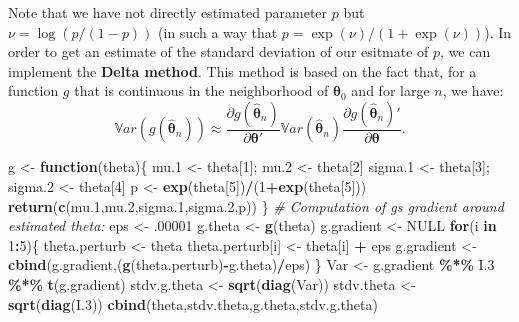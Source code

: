 \documentclass[
  12pt,
]{book}
\newenvironment{Shaded}{\begin{snugshade}}{\end{snugshade}}
\newcommand{\CommentTok}[1]{\textcolor[rgb]{0.56,0.35,0.01}{\textit{#1}}}
\newcommand{\ConstantTok}[1]{\textcolor[rgb]{0.56,0.35,0.01}{#1}}
\newcommand{\ControlFlowTok}[1]{\textcolor[rgb]{0.13,0.29,0.53}{\textbf{#1}}}
\newcommand{\DecValTok}[1]{\textcolor[rgb]{0.00,0.00,0.81}{#1}}
\newcommand{\FloatTok}[1]{\textcolor[rgb]{0.00,0.00,0.81}{#1}}
\newcommand{\FunctionTok}[1]{\textcolor[rgb]{0.13,0.29,0.53}{\textbf{#1}}}
\newcommand{\NormalTok}[1]{#1}
\newcommand{\OtherTok}[1]{\textcolor[rgb]{0.56,0.35,0.01}{#1}}
\newcommand{\SpecialCharTok}[1]{\textcolor[rgb]{0.81,0.36,0.00}{\textbf{#1}}}
\theoremstyle{definition}
\theoremstyle{definition}
\theoremstyle{definition}
\theoremstyle{definition}
\theoremstyle{remark}
\begin{document}
Note that we have not directly estimated parameter \(p\) but \(\nu = \log(p/(1-p))\) (in such a way that \(p = \exp(\nu)/(1+\exp(\nu))\)). In order to get an estimate of the standard deviation of our esitmate of \(p\), we can implement the \textbf{Delta method}. This method is based on the fact that, for a function \(g\) that is continuous in the neighborhood of \(\boldsymbol\theta_0\) and for large \(n\), we have:
\begin{equation}
\mathbb{V}ar(g(\hat{\boldsymbol\theta}_n)) \approx \frac{\partial g(\hat{\boldsymbol\theta}_n)}{\partial \boldsymbol\theta'}\mathbb{V}ar(\hat{\boldsymbol\theta}_n)\frac{\partial g(\hat{\boldsymbol\theta}_n)'}{\partial \boldsymbol\theta}.\label{eq:DeltaMethod}
\end{equation}

\begin{Shaded}
\begin{Highlighting}[]
\NormalTok{g }\OtherTok{\textless{}{-}} \ControlFlowTok{function}\NormalTok{(theta)\{}
\NormalTok{  mu}\FloatTok{.1} \OtherTok{\textless{}{-}}\NormalTok{ theta[}\DecValTok{1}\NormalTok{]; mu}\FloatTok{.2} \OtherTok{\textless{}{-}}\NormalTok{ theta[}\DecValTok{2}\NormalTok{]}
\NormalTok{  sigma}\FloatTok{.1} \OtherTok{\textless{}{-}}\NormalTok{ theta[}\DecValTok{3}\NormalTok{]; sigma}\FloatTok{.2} \OtherTok{\textless{}{-}}\NormalTok{ theta[}\DecValTok{4}\NormalTok{]}
\NormalTok{  p }\OtherTok{\textless{}{-}} \FunctionTok{exp}\NormalTok{(theta[}\DecValTok{5}\NormalTok{])}\SpecialCharTok{/}\NormalTok{(}\DecValTok{1}\SpecialCharTok{+}\FunctionTok{exp}\NormalTok{(theta[}\DecValTok{5}\NormalTok{]))}
  \FunctionTok{return}\NormalTok{(}\FunctionTok{c}\NormalTok{(mu}\FloatTok{.1}\NormalTok{,mu}\FloatTok{.2}\NormalTok{,sigma}\FloatTok{.1}\NormalTok{,sigma}\FloatTok{.2}\NormalTok{,p))}
\NormalTok{\}}
\CommentTok{\# Computation of g\textquotesingle{}s gradient around estimated theta:}
\NormalTok{eps }\OtherTok{\textless{}{-}}\NormalTok{ .}\DecValTok{00001}
\NormalTok{g.theta }\OtherTok{\textless{}{-}} \FunctionTok{g}\NormalTok{(theta)}
\NormalTok{g.gradient }\OtherTok{\textless{}{-}} \ConstantTok{NULL}
\ControlFlowTok{for}\NormalTok{(i }\ControlFlowTok{in} \DecValTok{1}\SpecialCharTok{:}\DecValTok{5}\NormalTok{)\{}
\NormalTok{  theta.perturb }\OtherTok{\textless{}{-}}\NormalTok{ theta}
\NormalTok{  theta.perturb[i] }\OtherTok{\textless{}{-}}\NormalTok{ theta[i] }\SpecialCharTok{+}\NormalTok{ eps}
\NormalTok{  g.gradient }\OtherTok{\textless{}{-}} \FunctionTok{cbind}\NormalTok{(g.gradient,(}\FunctionTok{g}\NormalTok{(theta.perturb)}\SpecialCharTok{{-}}\NormalTok{g.theta)}\SpecialCharTok{/}\NormalTok{eps)}
\NormalTok{\}}
\NormalTok{Var }\OtherTok{\textless{}{-}}\NormalTok{ g.gradient }\SpecialCharTok{\%*\%}\NormalTok{ I}\FloatTok{.3} \SpecialCharTok{\%*\%} \FunctionTok{t}\NormalTok{(g.gradient)}
\NormalTok{stdv.g.theta }\OtherTok{\textless{}{-}} \FunctionTok{sqrt}\NormalTok{(}\FunctionTok{diag}\NormalTok{(Var))}
\NormalTok{stdv.theta }\OtherTok{\textless{}{-}} \FunctionTok{sqrt}\NormalTok{(}\FunctionTok{diag}\NormalTok{(I}\FloatTok{.3}\NormalTok{))}
\FunctionTok{cbind}\NormalTok{(theta,stdv.theta,g.theta,stdv.g.theta)}
\end{Highlighting}
\end{Shaded}
\end{document}

